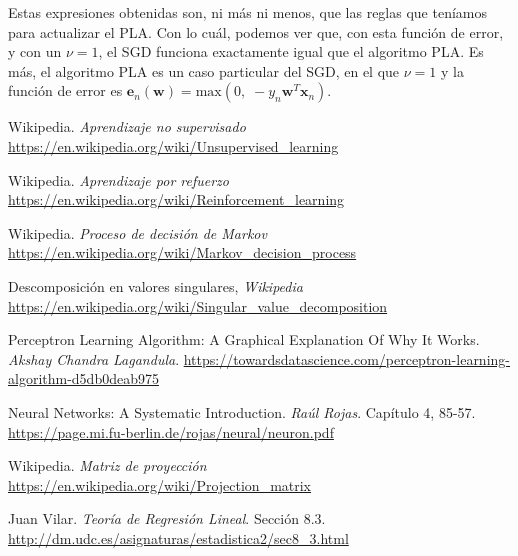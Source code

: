 \documentclass[11pt,a4paper]{article}
\newcommand{\maximum}{\text{max}}
\begin{document}
Estas expresiones obtenidas son, ni más ni menos, que las reglas que teníamos para actualizar el PLA. Con lo cuál, podemos ver
que, con esta función de error, y con un $\nu = 1$, el SGD funciona exactamente igual que el algoritmo PLA. Es más, el
algoritmo PLA es un caso particular del SGD, en el que $\nu = 1$ y la función de error es
$\mathbf{e}_n(\mathbf{w}) = \maximum(0, \; -y_n\mathbf{w}^T\mathbf{x}_n)$.

\newpage

\begin{thebibliography}{10}

Wikipedia. \textit{Aprendizaje no supervisado}
\\\url{https://en.wikipedia.org/wiki/Unsupervised_learning}

Wikipedia. \textit{Aprendizaje por refuerzo}
\\\url{https://en.wikipedia.org/wiki/Reinforcement_learning}

Wikipedia. \textit{Proceso de decisión de Markov}
\\\url{https://en.wikipedia.org/wiki/Markov_decision_process}

Descomposición en valores singulares, \textit{Wikipedia}
\\\url{https://en.wikipedia.org/wiki/Singular_value_decomposition}

Perceptron Learning Algorithm: A Graphical Explanation Of Why It Works. \textit{Akshay Chandra Lagandula}.
\url{https://towardsdatascience.com/perceptron-learning-algorithm-d5db0deab975}

Neural Networks: A Systematic Introduction. \textit{Raúl Rojas}. Capítulo 4, 85-57.
\\\url{https://page.mi.fu-berlin.de/rojas/neural/neuron.pdf}

Wikipedia. \textit{Matriz de proyección}
\\\url{https://en.wikipedia.org/wiki/Projection_matrix}

Juan Vilar. \textit{Teoría de Regresión Lineal}. Sección 8.3.
\\\url{http://dm.udc.es/asignaturas/estadistica2/sec8_3.html}

\end{thebibliography}
\end{document}
